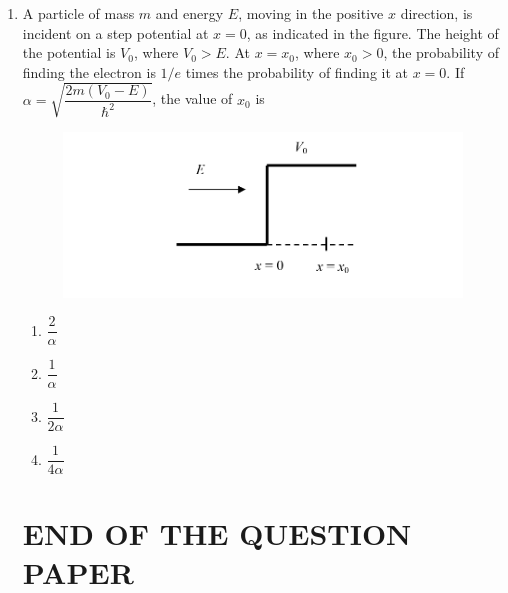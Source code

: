 \documentclass[journal,12pt,onecolumn]{IEEEtran}
\theoremstyle{remark}
\begin{document}
\begin{enumerate}
    \item A particle of mass $m$ and energy $E$, moving in the positive $x$ direction, is incident on a step potential at $x = 0$, as indicated in the figure. The height of the potential is $V_0$, where $V_0 > E$. At $x = x_0$, where $x_0 > 0$, the probability of finding the electron is $1/e$ times the probability of finding it at $x = 0$. If $\alpha = \sqrt{\dfrac{2m(V_0 - E)}{\hbar^2}}$, the value of $x_0$ is
\begin{figure}[H]
    \centering
    \includegraphics[width = 0.5\columnwidth]{fig/Q55.png}
    \caption*{}
    \label{fig:Q55}
\end{figure}
    \begin{multicols}{4}
    \begin{enumerate}
        \item $\dfrac{2}{\alpha}$
        \item $\dfrac{1}{\alpha}$
        \item $\dfrac{1}{2\alpha}$
        \item $\dfrac{1}{4\alpha}$
    \end{enumerate}
    \end{multicols}
    \section*{END OF THE QUESTION PAPER}





\end{enumerate}



    
\end{document}
